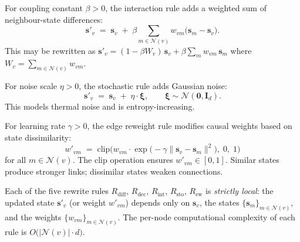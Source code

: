 \begin{definition}
\label{def:11.11}
For coupling constant $\beta > 0$, the interaction rule adds a
weighted sum of neighbour-state differences:
\begin{equation}
\label{eq:11.interaction}
  \mathbf{s}'_v \;=\;
  \mathbf{s}_v
  \;+\;
  \beta \sum_{m \in \mathcal{N}(v)}
  w_{vm}\bigl(\mathbf{s}_m - \mathbf{s}_v\bigr).
\end{equation}
This may be rewritten as
$\mathbf{s}'_v = (1 - \beta W_v)\,\mathbf{s}_v + \beta
\sum_m w_{vm}\,\mathbf{s}_m$
where $W_v = \sum_{m \in \mathcal{N}(v)} w_{vm}$.
\end{definition}

\begin{definition}
\label{def:11.12}
For noise scale $\eta > 0$, the stochastic rule adds Gaussian noise:
\begin{equation}
\label{eq:11.stochastic}
  \mathbf{s}'_v \;=\;
  \mathbf{s}_v \;+\; \eta \cdot \boldsymbol{\xi},
  \qquad
  \boldsymbol{\xi} \sim \mathcal{N}(\mathbf{0}, \mathbf{I}_d).
\end{equation}
This models thermal noise and is entropy-increasing.
\end{definition}

\begin{definition}
\label{def:11.13}
For learning rate $\gamma > 0$, the edge reweight rule modifies
causal weights based on state dissimilarity:
\begin{equation}
\label{eq:11.edge_reweight}
  w'_{vm} \;=\;
  \mathrm{clip}\!\Big(
    w_{vm} \cdot \exp\!\bigl(-\gamma \|\mathbf{s}_v - \mathbf{s}_m\|^2\bigr),
  \;0,\;1\Big)
\end{equation}
for all $m \in \mathcal{N}(v)$.  The $\mathrm{clip}$ operation
ensures $w'_{vm} \in [0,1]$.  Similar states produce stronger links;
dissimilar states weaken connections.
\end{definition}

\begin{theorem}
\label{thm:11.1}
Each of the five rewrite rules
$R_{\mathrm{diff}}$, $R_{\mathrm{dec}}$, $R_{\mathrm{int}}$,
$R_{\mathrm{sto}}$, $R_{\mathrm{ew}}$ is \emph{strictly local}:
the updated state $\mathbf{s}'_v$ (or weight $w'_{vm}$) depends only
on $\mathbf{s}_v$, the states $\{\mathbf{s}_m\}_{m \in \mathcal{N}(v)}$,
and the weights $\{w_{vm}\}_{m \in \mathcal{N}(v)}$.  The per-node
computational complexity of each rule is
$O\!\bigl(|\mathcal{N}(v)| \cdot d\bigr)$.
\end{theorem}

